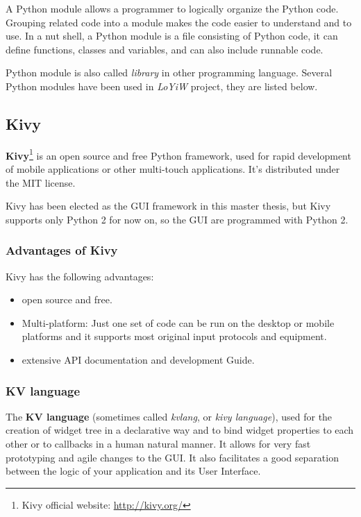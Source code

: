 A Python module allows a programmer to logically organize the Python code. Grouping related code into a module makes the code easier to understand and to use. In a nut shell, a Python module is a file consisting of Python code, it can define functions, classes and variables, and can also include runnable code.

Python module is also called \textit{library} in other programming language. Several Python modules have been used in \textit{LoYiW} project, they are listed below.

\subsection{Kivy}
\textbf{Kivy}\footnote{Kivy official website: \url{http://kivy.org/}} is an open source and free Python framework, used for rapid development of mobile applications or other multi-touch applications. It's distributed under the MIT license.

Kivy has been elected as the GUI framework in this master thesis, but Kivy supports only Python 2 for now on, so the GUI are programmed with Python 2.

\subsubsection{Advantages of Kivy}
Kivy has the following advantages:

\begin{itemize}
	\item open source and free.
	\item Multi-platform: Just one set of code can be run on the desktop or mobile platforms and it supports most original input protocols and equipment.
	\item extensive API documentation and development Guide.
\end{itemize}

\subsubsection{KV language}
The \textbf{KV language} (sometimes called \textit{kvlang}, or \textit{kivy language}), used for the creation of widget tree in a declarative way and to bind widget properties to each other or to callbacks in a human natural manner. It allows for very fast prototyping and agile changes to the GUI. It also facilitates a good separation between the logic of your application and its User Interface.

